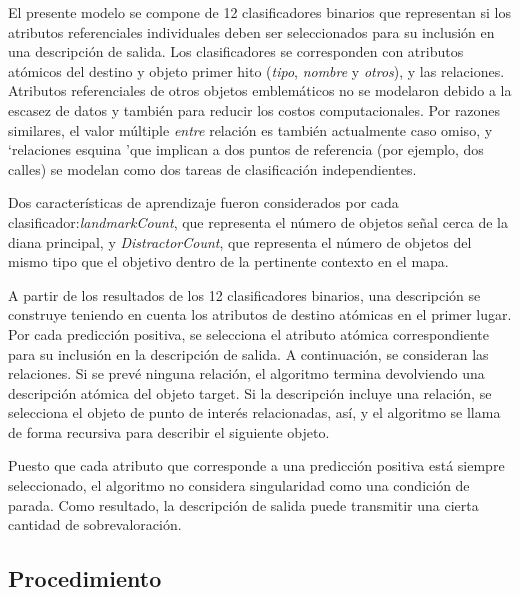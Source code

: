 

El presente modelo se compone de 12 clasificadores binarios que representan si los atributos referenciales individuales deben ser seleccionados para su inclusi\'on en una descripci\'on de salida. Los clasificadores se corresponden con atributos at\'omicos del destino y objeto primer hito ({\em tipo}, {\em nombre } y {\em otros}), y las relaciones. Atributos referenciales de otros objetos emblem\'aticos no se modelaron debido a la escasez de datos y tambi\'en para reducir los costos computacionales. Por razones similares, el valor m\'ultiple {\em entre} relaci\'on es tambi\'en actualmente caso omiso, y `relaciones esquina 'que implican a dos puntos de referencia (por ejemplo, dos calles) se modelan como dos tareas de clasificaci\'on independientes.

Dos caracter\'{i}sticas de aprendizaje fueron considerados por cada clasificador:{\em landmarkCount}, que representa el n\'umero de objetos se\~nal cerca de la diana principal, y {\em DistractorCount}, que representa el n\'umero de objetos del mismo tipo que el objetivo dentro de la pertinente contexto en el mapa.

A partir de los resultados de los 12 clasificadores binarios, una descripci\'on se construye teniendo en cuenta los atributos de destino at\'omicas en el primer lugar. Por cada predicci\'on positiva, se selecciona el atributo at\'omica correspondiente para su inclusi\'on en la descripci\'on de salida. A continuaci\'on, se consideran las relaciones. Si se prev\'e ninguna relaci\'on, el algoritmo termina devolviendo una descripci\'on at\'omica del objeto target. Si la descripci\'on incluye una relaci\'on, se selecciona el objeto de punto de inter\'es relacionadas, as\'{i}, y el algoritmo se llama de forma recursiva para describir el siguiente objeto.

Puesto que cada atributo que corresponde a una predicci\'on positiva est\'a siempre seleccionado, el algoritmo no considera singularidad como una condici\'on de parada. Como resultado, la descripci\'on de salida puede transmitir una cierta cantidad de sobrevaloraci\'on.

\subsection{Procedimiento}

